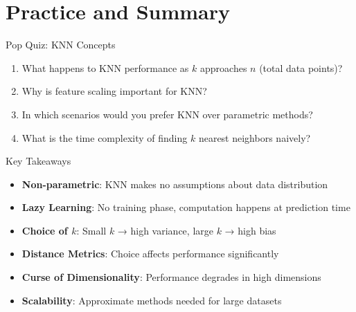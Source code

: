 \documentclass[usenames,dvipsnames]{beamer}
\begin{document}
{
	
}

\section{Practice and Summary}

\begin{frame}{Pop Quiz: KNN Concepts}
\begin{enumerate}
\item What happens to KNN performance as $k$ approaches $n$ (total data points)?
\pause
\item Why is feature scaling important for KNN?
\pause
\item In which scenarios would you prefer KNN over parametric methods?
\pause
\item What is the time complexity of finding $k$ nearest neighbors naively?
\end{enumerate}
\end{frame}

\begin{frame}{Key Takeaways}
\begin{itemize}[<+->]
\item \textbf{Non-parametric}: KNN makes no assumptions about data distribution
\item \textbf{Lazy Learning}: No training phase, computation happens at prediction time
\item \textbf{Choice of $k$}: Small $k$ → high variance, large $k$ → high bias
\item \textbf{Distance Metrics}: Choice affects performance significantly
\item \textbf{Curse of Dimensionality}: Performance degrades in high dimensions
\item \textbf{Scalability}: Approximate methods needed for large datasets
\end{itemize}
\end{frame}
\end{document}
